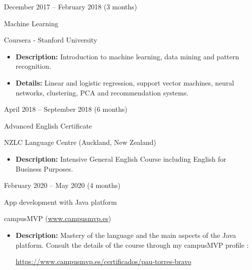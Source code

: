 \documentclass[a4paper,10pt]{article}
\newlength{\cvcolumngapwidth}
\newlength{\cvleftcolumnwidth}
\newlength{\cvrightcolumnwidth}
\newcommand{\cvtitlestyle}[1]{{\large\cvtitlefont\textcolor{cvtitlecolor}{#1}}}
\newcommand{\cvdurationstyle}[1]{{\small\cvdurationfont\textcolor{cvdurationcolor}{#1}}}
\newlength{\cvafteritemskipamount}
\newlength{\cvaftertitleskipamount}
\newlength{\cvparskip}
\newcommand{\cvitem}[2]{
    \begin{minipage}[t]{\cvleftcolumnwidth}
        \raggedleft #1
    \end{minipage}%
    \hspace{\cvcolumngapwidth}%
    \begin{minipage}[t]{\cvrightcolumnwidth}
        \setlength{\parskip}{\cvparskip} #2
    \end{minipage}

    \vspace{\cvafteritemskipamount}
}
\newcommand{\cvtitle}[1]{
    \cvtitlestyle{#1}

    \vspace{\cvaftertitleskipamount}
    \vspace{-\cvparskip}
}
\begin{document}
\cvitem{
 \cvdurationstyle{December 2017 -- February 2018 \hspace{80pt} (3 months)}
}{
    \cvtitle{Machine Learning} 

    Coursera - Stanford University
    \vspace{5pt}
    \begin{itemize}[leftmargin=*]
        \item \textbf{Description:} Introduction to machine learning, data mining and pattern recognition.
        \vspace{3pt}
        \item \textbf{Details:} Linear and logistic regression, support vector machines, neural networks, clustering, PCA and recommendation systems.
           
    \end{itemize}
}


\cvitem{
 \cvdurationstyle{April 2018 -- September 2018 \hspace{10pt}(6 months)}
}{
    \cvtitle{Advanced English Certificate} 

    NZLC Language Centre (Auckland, New Zealand)
    \vspace{5pt}
    \begin{itemize}[leftmargin=*]
        \item \textbf{Description:} Intensive General English Course including English for Business Purposes.
           
    \end{itemize}
}


\cvitem{
 \cvdurationstyle{February 2020 -- May 2020 \hspace{80pt}(4 months)}
}{
    \cvtitle{App development with Java platform} 

    campusMVP (\url{www.campusmvp.es})
    \vspace{5pt}
    \begin{itemize}[leftmargin=*]
        \item \textbf{Description:} Mastery of the language and the main aspects of the Java platform. Consult the details of the course through my campusMVP profile : 
        
        \begin{center}
            \url{https://www.campusmvp.es/certificados/pau-torres-bravo}
        \end{center}
          
    \end{itemize}
}
\end{document}
